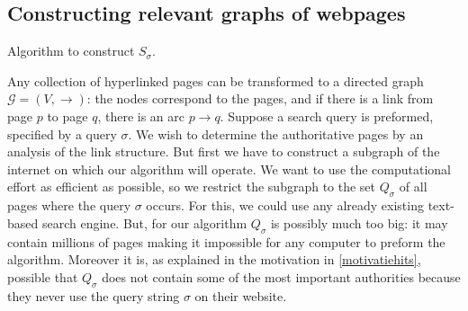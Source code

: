 \documentclass[a4paper,11pt]{report}
\newcommand{\graf}{\mathscr{G}}
\begin{document}
\subsection{Constructing relevant graphs of webpages}
\begin{algorithm}[t!]

\SetAlgoLined
 \blankline
{}
 
 \caption{Algorithm to construct $S_\sigma$.}\label{algoritmegraf}
\end{algorithm}
Any collection of hyperlinked pages can be transformed to a directed graph $\graf = (V, 
\to)$: the nodes correspond to the pages, and if there is a link from page $p$ 
to page $q$, there is an arc $p \to q$. Suppose a search query is preformed, 
specified by a query $\sigma$. We wish to determine the authoritative 
pages by an analysis of the link structure. But first we have to construct a 
subgraph of the internet on which our algorithm will operate. We want to use the 
computational effort as efficient as possible, so we restrict the subgraph to 
the set $Q_\sigma$ of all pages where the query $\sigma$ occurs. For this, we could use
any already existing text-based search engine.  But, for our algorithm $Q_\sigma$ 
is possibly much too big: it may contain millions of pages making it impossible 
for any computer to preform the algorithm. Moreover it is, as explained in the motivation in \ref{motivatiehits}, possible that $Q_\sigma$ 
does not contain some of the most important authorities because they never use 
the query string $\sigma$ on their website.
\end{document}
